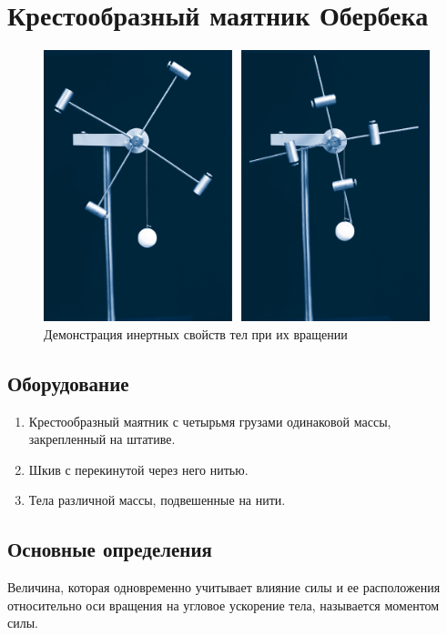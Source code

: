 \documentclass[All.tex]{subfiles}
\begin{document}
	

		\section{Крестообразный маятник Обербека}

	\begin{figure}[H] 	
		\centering 	
		\includegraphics[width=0.8\linewidth]{oberbeck-1.png}
		\caption{Демонстрация инертных свойств тел при их вращении}
		\label{oberbeck-1}
	\end{figure}
	
	\subsection*{\textcolor{PineGreen}{Оборудование}}
	
	\begin{enumerate} 
		\item Крестообразный маятник с четырьмя грузами одинаковой массы, закрепленный на штативе.
		\item Шкив с перекинутой через него нитью.
		\item Тела различной массы, подвешенные на нити.
	\end{enumerate}

	\subsection*{\textcolor{PineGreen}{Основные определения}}
	
	Величина, которая одновременно учитывает влияние силы и ее 
	расположения относительно оси вращения на угловое ускорение 
	тела, называется моментом силы. 
	
\end{document}
